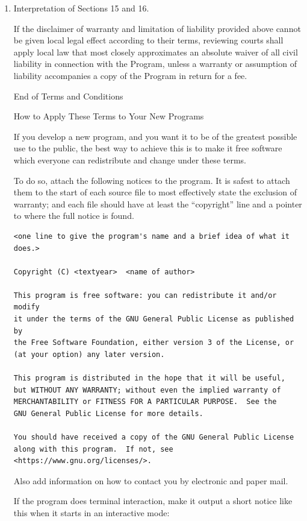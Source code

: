 \documentclass[11pt]{article}
\begin{document}
\begin{enumerate}
\item Interpretation of Sections 15 and 16.

If the disclaimer of warranty and limitation of liability provided
above cannot be given local legal effect according to their terms,
reviewing courts shall apply local law that most closely approximates
an absolute waiver of all civil liability in connection with the
Program, unless a warranty or assumption of liability accompanies a
copy of the Program in return for a fee.

\begin{center}
{\Large\sc End of Terms and Conditions}

\bigskip
How to Apply These Terms to Your New Programs
\end{center}

If you develop a new program, and you want it to be of the greatest
possible use to the public, the best way to achieve this is to make it
free software which everyone can redistribute and change under these terms.

To do so, attach the following notices to the program.  It is safest
to attach them to the start of each source file to most effectively
state the exclusion of warranty; and each file should have at least
the ``copyright'' line and a pointer to where the full notice is found.

{\footnotesize
\begin{verbatim}
<one line to give the program's name and a brief idea of what it does.>

Copyright (C) <textyear>  <name of author>

This program is free software: you can redistribute it and/or modify
it under the terms of the GNU General Public License as published by
the Free Software Foundation, either version 3 of the License, or
(at your option) any later version.

This program is distributed in the hope that it will be useful,
but WITHOUT ANY WARRANTY; without even the implied warranty of
MERCHANTABILITY or FITNESS FOR A PARTICULAR PURPOSE.  See the
GNU General Public License for more details.

You should have received a copy of the GNU General Public License
along with this program.  If not, see <https://www.gnu.org/licenses/>.
\end{verbatim}
}

Also add information on how to contact you by electronic and paper mail.

If the program does terminal interaction, make it output a short
notice like this when it starts in an interactive mode:


\end{enumerate}
\end{document}
